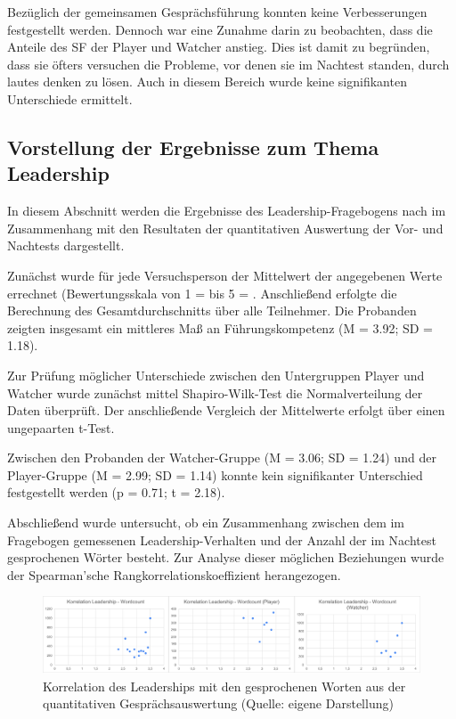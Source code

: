 Bezüglich der gemeinsamen Gesprächsführung konnten keine Verbesserungen festgestellt werden. Dennoch war eine Zunahme darin zu beobachten, dass die Anteile des \ac{SF} der Player und Watcher anstieg. Dies ist damit zu begründen, dass sie öfters versuchen die Probleme, vor denen sie im Nachtest standen, durch lautes denken zu lösen. Auch in diesem Bereich wurde keine signifikanten Unterschiede ermittelt.


\subsection{Vorstellung der Ergebnisse zum Thema Leadership}

In diesem Abschnitt werden die Ergebnisse des Leadership-Fragebogens nach \cite{emmerich_game_2016} im Zusammenhang mit den Resultaten der quantitativen Auswertung der Vor- und Nachtests dargestellt.

Zunächst wurde für jede Versuchsperson der Mittelwert der angegebenen Werte errechnet (Bewertungsskala von 1 =  bis 5 = . Anschließend erfolgte die Berechnung des Gesamtdurchschnitts über alle Teilnehmer. Die Probanden zeigten insgesamt ein mittleres Maß an Führungskompetenz (M = 3.92; SD = 1.18). 

Zur Prüfung möglicher Unterschiede zwischen den Untergruppen Player und Watcher wurde zunächst mittel Shapiro-Wilk-Test die Normalverteilung der Daten überprüft. Der anschließende Vergleich der Mittelwerte erfolgt über einen ungepaarten t-Test.

Zwischen den Probanden der Watcher-Gruppe (M = 3.06; SD = 1.24) und der Player-Gruppe (M = 2.99; SD = 1.14) konnte kein signifikanter Unterschied festgestellt werden (p = 0.71; t = 2.18).

Abschließend wurde untersucht, ob ein Zusammenhang zwischen dem im Fragebogen gemessenen Leadership-Verhalten und der Anzahl der im Nachtest gesprochenen Wörter besteht. Zur Analyse dieser möglichen Beziehungen wurde der  Spearman'sche Rangkorrelationskoeffizient herangezogen.

\begin{figure}[ht]
\centering
\includegraphics[width=1\linewidth]{content/pictures/Korrelation_Leadership_Wordcount_full.png}
\caption{Korrelation des Leaderships mit den gesprochenen Worten aus der quantitativen Gesprächsauswertung (Quelle: eigene Darstellung)}
\label{fig:correlation_leadership_wordcount}
\end{figure}

